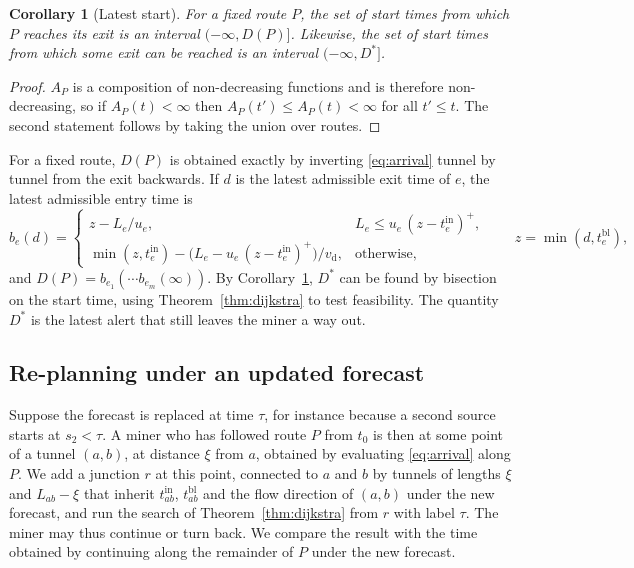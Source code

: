 \documentclass[11pt,a4paper]{article}
\theoremstyle{plain}
\newtheorem{corollary}{Corollary}
\theoremstyle{definition}
\theoremstyle{remark}
\newcommand{\tin}{t^{\mathrm{in}}}
\newcommand{\tbl}{t^{\mathrm{bl}}}
\newcommand{\vd}{v_{\mathrm{d}}}
\begin{document}
\begin{corollary}[Latest start]\label{cor:latest}
For a fixed route $P$, the set of start times from which $P$ reaches its exit is an interval $(-\infty, D(P)]$. Likewise, the set of start times from which some exit can be reached is an interval $(-\infty, D^*]$.
\end{corollary}
\begin{proof}
$A_P$ is a composition of non-decreasing functions and is therefore non-decreasing, so if $A_P(t) < \infty$ then $A_P(t') \le A_P(t) < \infty$ for all $t' \le t$. The second statement follows by taking the union over routes.
\end{proof}

For a fixed route, $D(P)$ is obtained exactly by inverting \eqref{eq:arrival} tunnel by tunnel from the exit backwards. If $d$ is the latest admissible exit time of $e$, the latest admissible entry time is
\[
  b_e(d) = \begin{cases}
    z - L_e/u_e, & L_e \le u_e\,(z - \tin_e)^+,\\
    \min(z, \tin_e) - \bigl(L_e - u_e\,(z - \tin_e)^+\bigr)/\vd, & \text{otherwise},
  \end{cases}
  \qquad z = \min(d, \tbl_e),
\]
and $D(P) = b_{e_1}(\cdots b_{e_m}(\infty))$. By Corollary~\ref{cor:latest}, $D^*$ can be found by bisection on the start time, using Theorem~\ref{thm:dijkstra} to test feasibility. The quantity $D^*$ is the latest alert that still leaves the miner a way out.

\subsection{Re-planning under an updated forecast}\label{sec:replan}
Suppose the forecast is replaced at time $\tau$, for instance because a second source starts at $s_2 < \tau$. A miner who has followed route $P$ from $t_0$ is then at some point of a tunnel $(a, b)$, at distance $\xi$ from $a$, obtained by evaluating \eqref{eq:arrival} along $P$. We add a junction $r$ at this point, connected to $a$ and $b$ by tunnels of lengths $\xi$ and $L_{ab} - \xi$ that inherit $\tin_{ab}$, $\tbl_{ab}$ and the flow direction of $(a, b)$ under the new forecast, and run the search of Theorem~\ref{thm:dijkstra} from $r$ with label $\tau$. The miner may thus continue or turn back. We compare the result with the time obtained by continuing along the remainder of $P$ under the new forecast.

\end{document}
